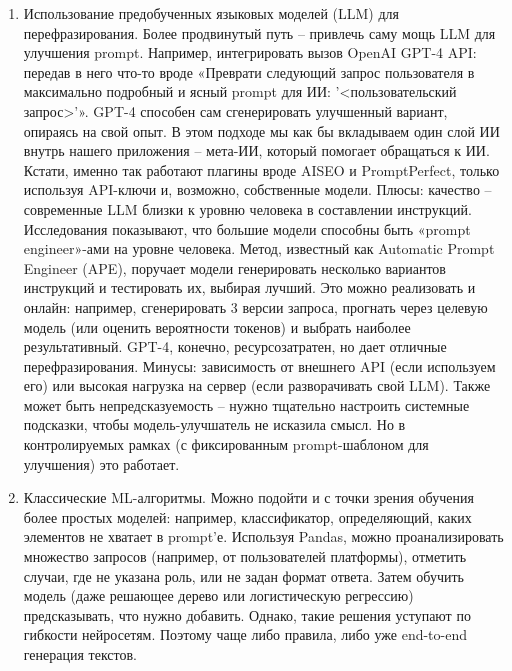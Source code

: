 \begin{enumerate}[label=\arabic*]
\item Использование предобученных языковых моделей (LLM) для перефразирования. Более продвинутый путь – привлечь саму мощь LLM для улучшения prompt. Например, интегрировать вызов OpenAI GPT-4 API: передав в него что-то вроде «Преврати следующий запрос пользователя в максимально подробный и ясный prompt для ИИ: '<пользовательский запрос>'». GPT-4 способен сам сгенерировать улучшенный вариант, опираясь на свой опыт. В этом подходе мы как бы вкладываем один слой ИИ внутрь нашего приложения – мета-ИИ, который помогает обращаться к ИИ. Кстати, именно так работают плагины вроде AISEO и PromptPerfect, только используя API-ключи и, возможно, собственные модели. Плюсы: качество – современные LLM близки к уровню человека в составлении инструкций\cite{restack:advprompt}. Исследования показывают, что большие модели способны быть «prompt engineer»-ами на уровне человека\cite{arxiv:2211.01910}. Метод, известный как Automatic Prompt Engineer (APE), поручает модели генерировать несколько вариантов инструкций и тестировать их, выбирая лучший\cite{restack:advprompt}. Это можно реализовать и онлайн: например, сгенерировать 3 версии запроса, прогнать через целевую модель (или оценить вероятности токенов) и выбрать наиболее результативный. GPT-4, конечно, ресурсозатратен, но дает отличные перефразирования. Минусы: зависимость от внешнего API (если используем его) или высокая нагрузка на сервер (если разворачивать свой LLM). Также может быть непредсказуемость – нужно тщательно настроить системные подсказки, чтобы модель-улучшатель не исказила смысл. Но в контролируемых рамках (с фиксированным prompt-шаблоном для улучшения) это работает.


\item Классические ML-алгоритмы. Можно подойти и с точки зрения обучения более простых моделей: например, классификатор, определяющий, каких элементов не хватает в prompt’е. Используя Pandas, можно проанализировать множество запросов (например, от пользователей платформы), отметить случаи, где не указана роль, или не задан формат ответа. Затем обучить модель (даже решающее дерево или логистическую регрессию) предсказывать, что нужно добавить. Однако, такие решения уступают по гибкости нейросетям. Поэтому чаще либо правила, либо уже end-to-end генерация текстов.


\end{enumerate}

